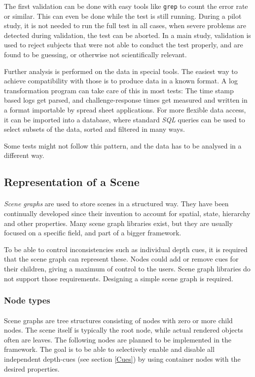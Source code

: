 The first validation can be done with easy tools like \texttt{grep} to count the error rate or similar.
This can even be done while the test is still running.
During a pilot study, it is not needed to run the full test in all cases, when severe problems are detected during validation, the test can be aborted.
In a main study, validation is used to reject subjects that were not able to conduct the test properly, and are found to be guessing, or otherwise not scientifically relevant.

Further analysis is performed on the data in special tools.
The easiest way to achieve compatibility with those is to produce data in a known format.
A log transformation program can take care of this in most tests: The time stamp based logs get parsed, and challenge-response times get measured and written in a format importable by spread sheet applications.
For more flexible data access, it can be imported into a database, where standard \textit{SQL} queries can be used to select subsets of the data, sorted and filtered in many ways.

Some tests might not follow this pattern, and the data has to be analysed in a different way.


\subsection{Representation of a Scene\label{sceneRep}}
\paragraph{}
\textit{Scene graphs} are used to store scenes in a structured way. They have been continually developed since their invention\cite{scenegraph} to account for spatial, state, hierarchy and other properties.
Many scene graph libraries exist, but they are usually focused on a specific field, and part of a bigger framework.

To be able to control inconsistencies such as individual depth cues, it is required that the scene graph can represent these. Nodes could add or remove cues for their children, giving a maximum of control to the users. Scene graph libraries do not support those requirements. Designing a simple scene graph is required.

\subsubsection{Node types\label{nodeTypes}}
\paragraph{}
Scene graphs are tree structures consisting of nodes with zero or more child nodes. The scene itself is typically the root node, while actual rendered objects often are leaves. The following nodes are planned to be implemented in the framework.
The goal is to be able to selectively enable and disable all independent depth-cues (see section \ref{Cues}) by using container nodes with the desired properties.

